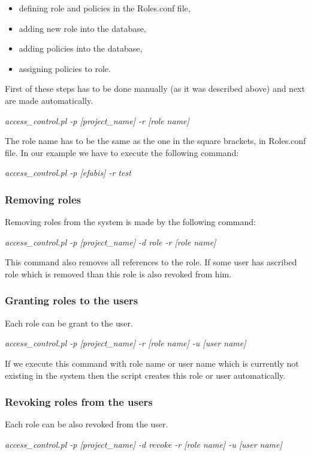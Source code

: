 \begin{itemize}
\item defining role and policies in the Roles.conf file,
\item adding new role into the database,
\item adding policies into the database,
\item assigning policies to role.
\end{itemize} 
First of these steps has to be done manually (as it was described above) and next are made automatically.
\begin{center}
\textit{access\_control.pl -p [project\_name] -r [role name]}
\end{center} 
The role name has to be the same as the one in the square brackets, in Roles.conf file. In our example we have to execute the following command:   
\begin{center}
\textit{access\_control.pl -p [efabis] -r test}
\end{center} 

\subsubsection{Removing roles}
Removing roles from the system is made by the following command:
\begin{center}
\textit{access\_control.pl -p [project\_name] -d role -r [role name] }
\end{center} 
This command also removes all references to the role. If some user has ascribed role which is removed than this role is also revoked from him.

\subsubsection{Granting roles to the users\label{Granting roles to the users}}
Each role can be grant to the user.
\begin{center}
\textit{access\_control.pl -p [project\_name] -r [role name] -u [user name]}
\end{center}
If we execute this command with role name or user name which is currently not existing in the system then the script creates this role or user automatically.
 
\subsubsection{Revoking roles from the users}
Each role can be also revoked from the user.
\begin{center}
\textit{access\_control.pl -p [project\_name] -d revoke -r [role name] -u [user name]}
\end{center}

